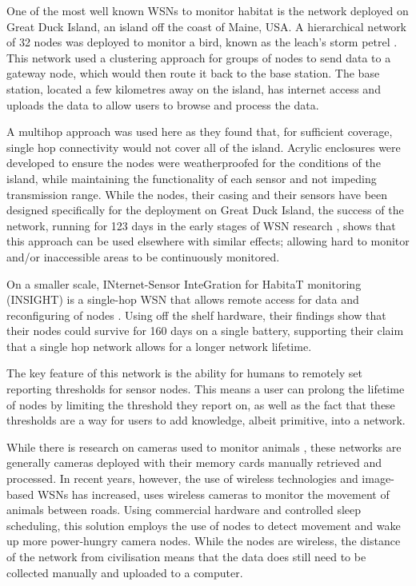	One of the most well known WSNs to monitor habitat is the network deployed on Great Duck Island, an island off the coast of Maine, USA. A hierarchical network of 32 nodes was deployed to monitor a bird, known as the leach's storm petrel \cite{Mainwaring2002}. This network used a clustering approach for groups of nodes to send data to a gateway node, which would then route it back to the base station. The base station, located a few kilometres away on the island, has internet access and uploads the data to allow users to browse and process the data.

	A multihop approach was used here as they found that, for sufficient coverage, single hop connectivity would not cover all of the island. Acrylic enclosures were developed to ensure the nodes were weatherproofed for the conditions of the island, while maintaining the functionality of each sensor and not impeding transmission range. While the nodes, their casing and their sensors have been designed specifically for the deployment on Great Duck Island, the success of the network, running for 123 days in the early stages of WSN research \cite{Szewczyk2004c}, shows that this approach can be used elsewhere with similar effects; allowing hard to monitor and/or inaccessible areas to be continuously monitored.

	On a smaller scale, INternet-Sensor InteGration for HabitaT monitoring (INSIGHT) is a single-hop WSN that allows remote access for data and reconfiguring of nodes \cite{Demirbas}. Using off the shelf hardware, their findings show that their nodes could survive for 160 days on a single battery, supporting their claim that a single hop network allows for a longer network lifetime. 
	
	The key feature of this network is the ability for humans to remotely set reporting thresholds for sensor nodes. This means a user can prolong the lifetime of nodes by limiting the threshold they report on, as well as the fact that these thresholds are a way for users to add knowledge, albeit primitive, into a network.

	While there is research on cameras used to monitor animals \cite{Kays2009, Ahumada2011a}, these networks are generally cameras deployed with their memory cards manually retrieved and processed. In recent years, however, the use of wireless technologies and image-based WSNs has increased, \cite{Garcia-Sanchez2010b} uses wireless cameras to monitor the movement of animals between roads. Using commercial hardware and controlled sleep scheduling, this solution employs the use of nodes to detect movement and wake up more power-hungry camera nodes. While the nodes are wireless, the distance of the network from civilisation means that the data does still need to be collected manually and uploaded to a computer.

